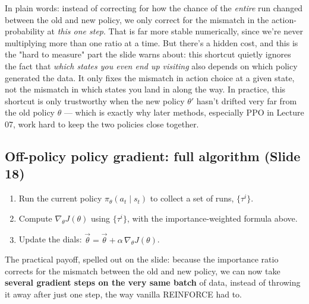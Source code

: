 \documentclass[11pt]{article}
\begin{document}
In plain words: instead of correcting for how the chance of the \emph{entire} run changed between the old and new policy, we only correct for the mismatch in the action-probability at \emph{this one step}. That is far more stable numerically, since we're never multiplying more than one ratio at a time. But there's a hidden cost, and this is the "hard to measure" part the slide warns about: this shortcut quietly ignores the fact that \emph{which states you even end up visiting} also depends on which policy generated the data. It only fixes the mismatch in action choice at a given state, not the mismatch in which states you land in along the way. In practice, this shortcut is only trustworthy when the new policy $\theta'$ hasn't drifted very far from the old policy $\theta$ --- which is exactly why later methods, especially PPO in Lecture 07, work hard to keep the two policies close together.

\subsection{Off-policy policy gradient: full algorithm (Slide 18)}
\begin{enumerate}[leftmargin=*]
  \item Run the current policy $\pi_\theta(a_t\mid s_t)$ to collect a set of runs, $\{\tau^i\}$.
  \item Compute $\nabla_\theta J(\theta)$ using $\{\tau^i\}$, with the importance-weighted formula above.
  \item Update the dials: $\vec\theta = \vec\theta + \alpha\,\nabla_\theta J(\theta)$.
\end{enumerate}
The practical payoff, spelled out on the slide: because the importance ratio corrects for the mismatch between the old and new policy, we can now take \textbf{several gradient steps on the very same batch} of data, instead of throwing it away after just one step, the way vanilla REINFORCE had to.
\end{document}
